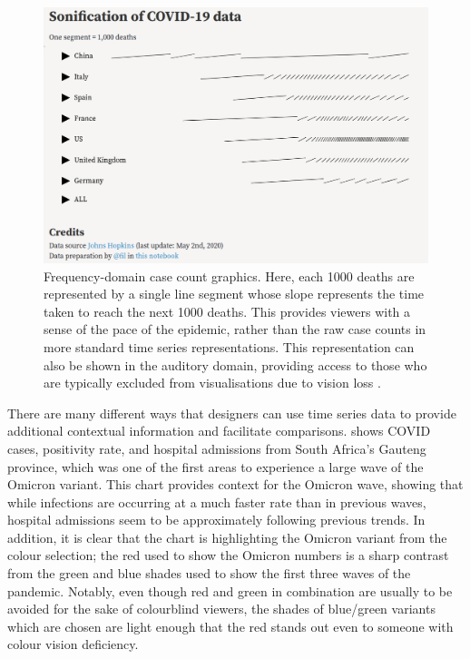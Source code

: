 \documentclass[article]{jdssv}\usepackage[]{graphicx}\usepackage[]{color}
\begin{document}
\begin{figure}
\centering
\includegraphics[width=.75\linewidth]{frequency-domain}
\caption{Frequency-domain case count graphics. Here, each 1000 deaths are represented by a single line segment whose slope represents the time taken to reach the next 1000 deaths. This provides viewers with a sense of the pace of the epidemic, rather than the raw case counts in more standard time series representations. This representation can also be shown in the auditory domain, providing access to those who are typically excluded from visualisations due to vision loss \citep{vuillemotSonificationCOVID19Data2020}.}
\label{fig:freq-domain}
\end{figure}

There are many different ways that designers can use time series data to provide additional contextual information and facilitate comparisons.  shows COVID cases, positivity rate, and hospital admissions from South Africa's Gauteng province, which was one of the first areas to experience a large wave of the Omicron variant. This chart provides context for the Omicron wave, showing that while infections are occurring at a much faster rate than in previous waves, hospital admissions seem to be approximately following previous trends. In addition, it is clear that the chart is highlighting the Omicron variant from the colour selection; the red used to show the Omicron numbers is a sharp contrast from the green and blue shades used to show the first three waves of the pandemic. Notably, even though red and green in combination are usually to be avoided for the sake of colourblind viewers, the shades of blue/green variants which are chosen are light enough that the red stands out even to someone with colour vision deficiency.
\end{document}

